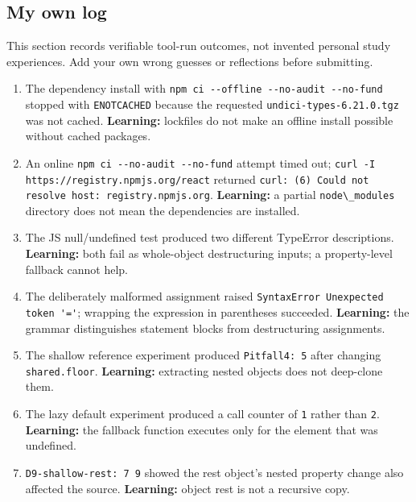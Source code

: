 \documentclass[
  10pt,
]{article}
\newcommand{\passthrough}[1]{#1}
\providecommand{\tightlist}{%
  \setlength{\itemsep}{0pt}\setlength{\parskip}{0pt}}
\begin{document}
\subsection{My own log}\label{my-own-log}

This section records verifiable tool-run outcomes, not invented personal
study experiences. Add your own wrong guesses or reflections before
submitting.

\begin{enumerate}
\def\labelenumi{\arabic{enumi}.}
\tightlist
\item
  The dependency install with
  \passthrough{\lstinline!npm ci --offline --no-audit --no-fund!}
  stopped with \passthrough{\lstinline!ENOTCACHED!} because the
  requested \passthrough{\lstinline!undici-types-6.21.0.tgz!} was not
  cached. \textbf{Learning:} lockfiles do not make an offline install
  possible without cached packages.
\item
  An online \passthrough{\lstinline!npm ci --no-audit --no-fund!}
  attempt timed out;
  \passthrough{\lstinline!curl -I https://registry.npmjs.org/react!}
  returned
  \passthrough{\lstinline!curl: (6) Could not resolve host: registry.npmjs.org!}.
  \textbf{Learning:} a partial \passthrough{\lstinline!node\_modules!}
  directory does not mean the dependencies are installed.
\item
  The JS null/undefined test produced two different TypeError
  descriptions. \textbf{Learning:} both fail as whole-object
  destructuring inputs; a property-level fallback cannot help.
\item
  The deliberately malformed assignment raised
  \passthrough{\lstinline!SyntaxError Unexpected token '='!}; wrapping
  the expression in parentheses succeeded. \textbf{Learning:} the
  grammar distinguishes statement blocks from destructuring assignments.
\item
  The shallow reference experiment produced
  \passthrough{\lstinline!Pitfall4: 5!} after changing
  \passthrough{\lstinline!shared.floor!}. \textbf{Learning:} extracting
  nested objects does not deep-clone them.
\item
  The lazy default experiment produced a call counter of
  \passthrough{\lstinline!1!} rather than \passthrough{\lstinline!2!}.
  \textbf{Learning:} the fallback function executes only for the element
  that was undefined.
\item
  \passthrough{\lstinline!D9-shallow-rest: 7 9!} showed the rest
  object's nested property change also affected the source.
  \textbf{Learning:} object rest is not a recursive copy.

\end{enumerate}
\end{document}
